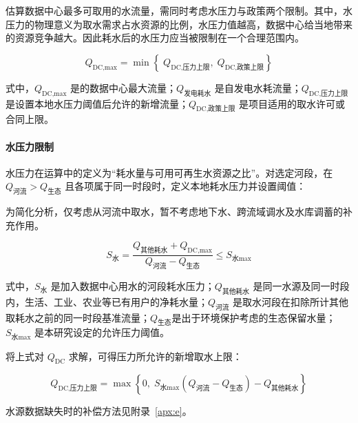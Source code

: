 估算数据中心最多可取用的水流量，需同时考虑水压力与政策两个限制。其中，水压力的物理意义为取水需求占水资源的比例，水压力值越高，数据中心给当地带来的资源竞争越大。\cite{q1bref01}因此耗水后的水压力应当被限制在一个合理范围内。

\begin{equation}\label{eq:q1-qdc}
Q_{\text{DC,max}}= \min\left\{\;Q_{\text{DC,压力上限}},\;Q_{\text{DC,政策上限}}\right\}
\end{equation}

式中，$Q_{\text{DC,max}}$ 是的数据中心最大流量；$Q_{\text{发电耗水}}$ 是自发电水耗流量；$Q_{\text{DC,压力上限}}$ 是设置本地水压力阈值后允许的新增流量；$Q_{\text{DC,政策上限}}$ 是项目适用的取水许可或合同上限。

\paragraph{水压力限制}\label{sec:water-pressure}

水压力在运算中的定义为“耗水量与可用可再生水资源之比”。\cite{q1bref01}对选定河段，在 $Q_{\text{河流}} > Q_{\text{生态}}$ 且各项属于同一时段时，定义本地耗水压力并设置阈值：

\begin{asum}[以河流为主要水源]\label{asum:river}
为简化分析，仅考虑从河流中取水，暂不考虑地下水、跨流域调水及水库调蓄的补充作用。
\end{asum}

\begin{equation}\label{eq:q1-pressure}
S_{\text{水}}=\frac{Q_{\text{其他耗水}}+Q_{\text{DC,max}}}{Q_{\text{河流}}-Q_{\text{生态}}}\leq S_{\text{水}\max}
\end{equation}

式中，$S_{\text{水}}$ 是加入数据中心用水的河段耗水压力；$Q_{\text{其他耗水}}$ 是同一水源及同一时段内，生活、工业、农业等已有用户的净耗水量；$Q_{\text{河流}}$ 是取水河段在扣除所计其他取耗水之前的同一时段基准流量；$Q_{\text{生态}}$是出于环境保护考虑的生态保留水量；$S_{\text{水}\max}$ 是本研究设定的允许压力阈值。

将上式对 $Q_{\text{DC}}$ 求解，可得压力所允许的新增取水上限：

\begin{equation}\label{eq:q1-qdcpress}
Q_{\text{DC,压力上限}}
= \max\left\{0,\; S_{\text{水}\max}\left(Q_{\text{河流}}-Q_{\text{生态}}\right)-Q_{\text{其他耗水}}\right\}
\end{equation}

水源数据缺失时的补偿方法见附录~\ref{apx:e}。

